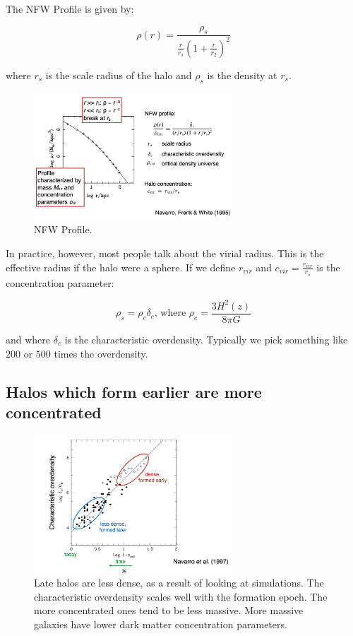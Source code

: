 \documentclass{article}
\begin{document}
The NFW Profile is given by:

\begin{equation}
    \rho(r) = \frac{\rho_s}{\frac{r}{r_s}\left(1 + \frac{r}{r_2}\right)^2}
\end{equation}

where $r_s$ is the scale radius of the halo and $\rho_s$ is the density at $r_s$. 

\begin{figure}
    \centering
\includegraphics[width=0.66\textwidth]{figs/Screen Shot 2021-10-13 at 10.28.42 AM.png}
    \caption{NFW Profile.}
    \label{fig:NFW}
\end{figure}

In practice, however, most people talk about the virial radius. This is the effective radius if the halo were a sphere. If we define $r_{vir}$ and $c_{vir} = \frac{r_{vir}}{r_s}$ is the concentration parameter:

\begin{equation}
    \rho_s = \rho_c \delta_{c} \text{, where } \rho_c = \frac{3 H^2(z)}{8\pi G}
\end{equation}

and where $\delta_c$ is the characteristic overdensity. Typically we pick something like $200$ or $500$ times the overdensity. 

\subsection{Halos which form earlier are more concentrated}

\begin{figure}
    \centering
\includegraphics[width=0.66\textwidth]{figs/Screen Shot 2021-10-13 at 10.38.12 AM.png}
    \caption{Late halos are less dense, as a result of looking at simulations. The characteristic overdensity scales well with the formation epoch. The more concentrated ones tend to be less massive. More massive galaxies have lower dark matter concentration parameters. }
    \label{fig:NFW_Over_Time}
\end{figure}
\end{document}
